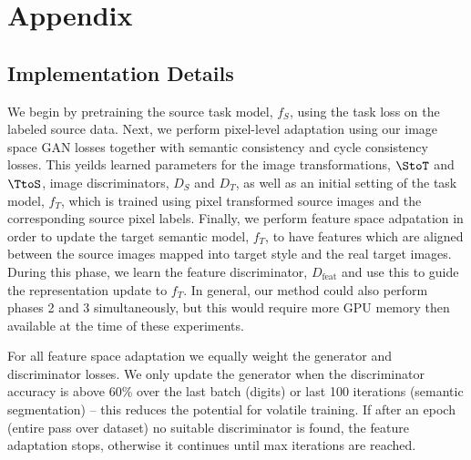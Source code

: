 \pagebreak
\section{Appendix}

\subsection{Implementation Details}
We begin by pretraining the source task model, $f_S$, using the task loss on the labeled source data. Next, we perform pixel-level adaptation using our image space GAN losses together with semantic consistency and cycle consistency losses. This yeilds learned parameters for the image transformations, $\StoT$ and $\TtoS$, image discriminators, $D_S$ and $D_T$, as well as an initial setting of the task model, $f_T$, which is trained using pixel transformed source images and the corresponding source pixel labels. Finally, we perform feature space adpatation in order to update the target semantic model, $f_T$, to have features which are aligned between the source images mapped into target style and the real target images. During this phase, we learn the feature discriminator, $D_\text{feat}$ and use this to guide the representation update to $f_T$. In general, our method could also perform phases 2 and 3 simultaneously, but this would require more GPU memory then available at the time of these experiments. 

For all feature space adaptation we equally weight the generator and discriminator losses. We only update the generator when the discriminator accuracy is above 60\% over the last batch (digits) or last 100 iterations (semantic segmentation) -- this reduces the potential for volatile training. If after an epoch (entire pass over dataset) no suitable discriminator is found, the feature adaptation stops, otherwise it continues until max iterations are reached. 



